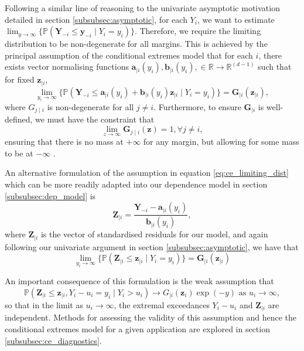 \documentclass{article}
\numberwithin{equation}{section}
\begin{document}
Following a similar line of reasoning to the univariate asymptotic motivation detailed in section \ref{subsubsec:asymptotic}, for each $Y_i$, we want to estimate $\lim_{y \to \infty}\{\mathbb{P}(\bm{Y}_{-i} \le \bm{y}_{-i} \mid Y_i = y_i)\}$. 
Therefore, we require the limiting distribution to be non-degenerate for all margins.
This is achieved by the principal assumption of the conditional extremes model that for each $i$, there exists vector normalising functions $\bm{a}_{\mid i}(y_i),\bm{b}_{\mid i}(y_i), \in \mathbb{R} \rightarrow \mathbb{R}^{(d-1)}$ such that for fixed $\bm{z}_{\mid i}$,
\begin{equation} \label{eq:ce_limiting_dist}
      \lim_{y_i \rightarrow \infty}\{\mathbb{P}(\bm{Y}_{-i} \le \bm{a}_{\mid i}(y_i) + \bm{b}_{\mid i}(y_i)\bm{z}_{\mid i} \mid Y_i = y_i)\} = \bm{G}_{\mid i}(\bm{z}_{\mid i}),
\end{equation}
where $G_{j \mid i}$ is non-degenerate for all $j \ne i$. 
Furthermore, to ensure $\bm{G}_{\mid i}$ is well-defined, we must have the constraint that 
\[
  \lim_{z \rightarrow \infty}{\bm{G}_{j \mid i}(\bm{z})} = 1, \forall j \ne i,
\]
ensuring that there is no mass at $+\infty$ for any margin, but allowing for some mass to be at $-\infty$ \cite{Keef2013}. 

An alternative formulation of the assumption in equation \ref{eq:ce_limiting_dist} which can be more readily adapted into our dependence model in section \ref{subsubsec:dep_model} is
\begin{equation} \label{eq:standardised_residuals}
  \bm{Z}_{\mid i} = \frac{\bm{Y}_{-i} - \bm{a}_{\mid i}(y_i)} {\bm{b}_{\mid i}(y_i)},
\end{equation}
where $\bm{Z}_{\mid i}$ is the vector of standardised residuals for our model, and again following our univariate argument in section \ref{subsubsec:asymptotic}, we have that
\[
      \lim_{y_i \rightarrow \infty}\{\mathbb{P}(\bm{Z}_{\mid i} \le \bm{z}_{\mid i} \mid Y_i = y_i)\} = \bm{G}_{\mid i}(\bm{z}_{\mid i})
\]

An important consequence of this formulation is the weak assumption that
\begin{equation} \label{eq:limit_independence}
\mathbb{P}(\bm{Z}_{\mid i} \le \bm{z}_{\mid i}, Y_i - u_i = y_i \mid Y_i > u_i) \rightarrow G_{\mid i}(\bm{z}_i) \exp(-y) \text{ as } u_i \rightarrow \infty,
\end{equation}
so that in the limit as $u_i \to \infty$, the extremal exceedances $Y_i - u_i$ and $\bm{Z}_{\mid i}$ are independent.
Methods for assessing the validity of this assumption and hence the conditional extremes model for a given application are explored in section \ref{subsubsec:ce_diagnostics}.
\end{document}

